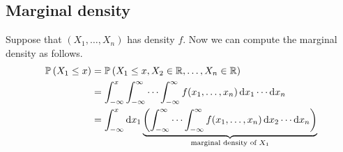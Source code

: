 \subsection{Marginal density}
Suppose that \((X_1, \dots, X_n)\) has density \(f\).
Now we can compute the marginal density as follows.
\begin{align*}
	\mathbb{P}\left({X_1 \leq x}\right) & = \mathbb{P}\left({X_1 \leq x, X_2 \in \mathbb R, \dots, X_n \in \mathbb R}\right)                                                                                                                        \\
	                  & = \int_{-\infty}^x \int_{-\infty}^\infty \cdots \int_{-\infty}^\infty f(x_1, \dots, x_n) \dd{x_1}\cdots \dd{x_n}                                                                        \\
	                  & = \int_{-\infty}^x \dd{x_1} \underbrace{\left( \int_{-\infty}^\infty \cdots \int_{-\infty}^\infty f(x_1, \dots, x_n) \dd{x_2}\cdots \dd{x_n} \right)}_{\text{marginal density of } X_1} \\
\end{align*}

